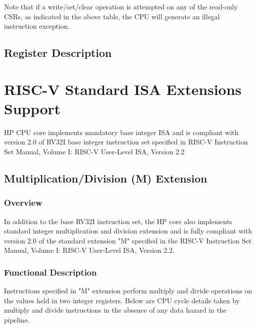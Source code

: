 \documentclass[main\_\_EN.tex]{subfiles}
\begin{document}

Note that if a write/set/clear operation is attempted on any of the read-only CSRs, as indicated in the above table, the CPU will generate an illegal instruction exception.

\subsection{Register Description}







\newpage
\section{RISC-V Standard ISA Extensions Support}


HP CPU core implements mandatory base integer ISA and is compliant with version 2.0 of RV32I base integer instruction set specified in RISC-V Instruction Set Manual, Volume I: RISC-V User-Level ISA, Version 2.2

\subsection{Multiplication/Division (M) Extension}
\label{sec:riscvcpu-mext}
\subsubsection{Overview}
\label{sec:riscvcpu-mext-overview}
In addition to the base RV32I instruction set, the HP core also implements standard integer multiplication and division extension and is fully compliant with version 2.0 of the standard extension "M" specified in the RISC-V Instruction Set Manual, Volume I: RISC-V User-Level ISA, Version 2.2.

\subsubsection{Functional Description}
\label{sec:riscvcpu-mext-func-descr}

Instructions specified in "M" extension perform multiply and divide operations on the values held in two integer registers. Below are CPU cycle details taken by multiply and divide instructions in the absence of any data hazard in the pipeline.
\end{document}
